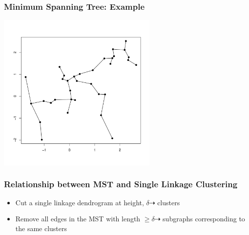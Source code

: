 \documentclass{beamer}
\begin{document}
\begin{frame}
  \frametitle{Minimum Spanning Tree: Example}

  
\begin{center}
\includegraphics[height=3.1in]{points-mst}
\end{center}
\end{frame}


\begin{frame}
  \frametitle{Relationship between MST and Single Linkage Clustering}


\begin{itemize}

\item Cut a single linkage dendrogram at height, $\delta \dashrightarrow$ clusters

\item Remove all edges in the MST with length $\geq \delta \dashrightarrow$ subgraphs corresponding to the same clusters

\end{itemize}

\end{frame}
\end{document}
